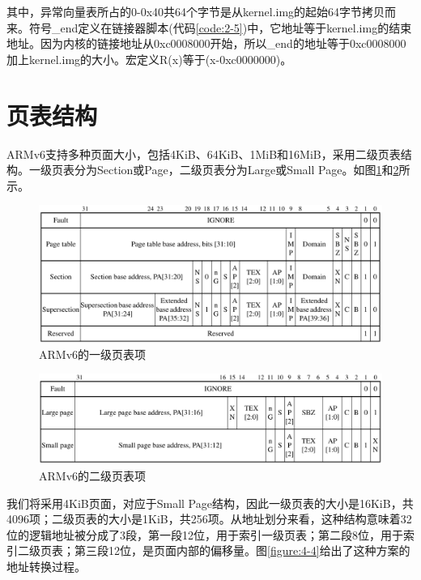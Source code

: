 \documentclass[main.tex]{subfiles}
\begin{document}
\begin{CJK*}{UTF8}{song}
\noindent
其中，异常向量表所占的0-0x40共64个字节是从kernel.img的起始64字节拷贝而来。符号\_end定义在链接器脚本(代码\ref{code:2-5})中，它地址等于kernel.img的结束地址。因为内核的链接地址从0xc0008000开始，所以\_end的地址等于0xc0008000加上kernel.img的大小。宏定义R(x)等于(x-0xc0000000)。

\section{页表结构}
ARMv6支持多种页面大小，包括4KiB、64KiB、1MiB和16MiB，采用二级页表结构。一级页表分为Section或Page，二级页表分为Large或Small Page。如图\ref{figure:4-2}和\ref{figure:4-3}所示。

\begin{figure}[htp]
\centering
\includegraphics[scale=0.3]{figures/4-2}
\caption{ARMv6的一级页表项}
\label{figure:4-2}
\end{figure}

\begin{figure}[htp]
\centering
\includegraphics[scale=0.3]{figures/4-3}
\caption{ARMv6的二级页表项}
\label{figure:4-3}
\end{figure}

我们将采用4KiB页面，对应于Small Page结构，因此一级页表的大小是16KiB，共4096项；二级页表的大小是1KiB，共256项。从地址划分来看，这种结构意味着32位的逻辑地址被分成了3段，第一段12位，用于索引一级页表；第二段8位，用于索引二级页表；第三段12位，是页面内部的偏移量。图\ref{figure:4-4}给出了这种方案的地址转换过程。


\end{CJK*}
\end{document}
